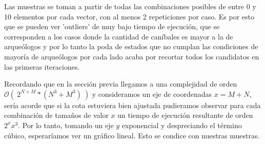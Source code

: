 Las muestras se toman a partir de todas las combinaciones posibles de entre 0 y 10 elementos por cada vector, con al menos 2 repeticiones por caso. Es por esto que se pueden ver 'outliers' de muy bajo tiempo de ejecución, que se corresponden a los casos donde la cantidad de caníbales es mayor a la de arqueólogos y por lo tanto la poda de estados que no cumplan las condiciones de mayoría de arqueólogos por cada lado acaba por recortar todos los candidatos en las primeras iteraciones. 

Recordando que en la sección previa llegamos a una complejidad de orden $ \mathcal{O}(\ 2^{N+M}*(N^3+M^3)\ )$ y consideramos un eje de coordenadas $x = M + N$, sería acorde que si la cota estuviera bien ajustada pudieramos observar para cada combinación de tamaños de valor $x$ un tiempo de ejecución resultante de orden $ 2^{x}x^3 $. Por lo tanto, tomando un eje $y$ exponencial y despreciando el término cúbico, esperaríamos ver un gráfico lineal. Esto se condice con nuestras muestras.
